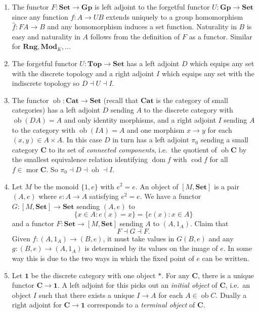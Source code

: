 \documentclass[a4paper]{article}
\renewcommand{\c}[1]{\mathbf{#1}}
\DeclareMathOperator{\ob}{ob}
\DeclareMathOperator{\mor}{mor}
\DeclareMathOperator{\dom}{dom}
\DeclareMathOperator{\cod}{cod}
\newcommand{\Set}{{\c{Set}}}
\newcommand{\Top}{{\c{Top}}}
\newcommand{\adjoint}{\dashv}
\begin{document}
\begin{eg}\leavevmode
  \begin{enumerate}
  \item The functor \(F: \Set \to \c{Gp}\) is left adjoint to the forgetful functor \(U: \c{Gp} \to \Set\) since any function \(f: A \to UB\) extends uniquely to a group homomorphism \(\hat f: FA \to B\) and any homomorphism induces a set function. Naturality in \(B\) is easy and naturality in \(A\) follows from the definition of \(F\) as a functor. Similar for \(\c{Rng}, \c{Mod}_K, \dots\)
  \item The forgetful functor \(U: \Top \to \Set\) has a left adjoint \(D\) which equips any set with the discrete topology and a right adjoint \(I\) which equips any set with the indiscrete topology so \(D \adjoint U \adjoint I\).
  \item The functor \(\ob: \c{Cat} \to \Set\) (recall that \(\c{Cat}\) is the category of small categories) has a left adjoint \(D\) sending \(A\) to the discrete category with \(\ob(DA) = A\) and only identity morphisms, and a right adjoint \(I\) sending \(A\) to the category with \(\ob(IA) = A\) and one morphism \(x \to y\) for each \((x, y) \in A \times A\). In this case \(D\) in turn has a left adjoint \(\pi_0\) sending a small category \(\c C\) to its set of \emph{connected components}, i.e.\ the quotient of \(\ob \c C\) by the smallest equivalence relation identifying \(\dom f\) with \(\cod f\) for all \(f \in \mor \c C\). So \(\pi_0 \adjoint D \adjoint \ob \adjoint I\).
  \item Let \(M\) be the monoid \(\{1, e\}\) with \(e^2 = e\). An object of \([M, \Set]\) is a pair \((A, e)\) where \(e: A \to A\) satisfying \(e^2 = e\). We have a functor \(G: [M, \Set] \to \Set\) sending \((A, e)\) to
    \[
      \{x \in A: e(x) = x\} = \{e(x): x \in A\}
    \]
    and a functor \(F: \Set \to [M, \Set]\) sending \(A\) to \((A, 1_A)\). Claim that
    \[
      F \adjoint G \adjoint F.
    \]
    Given \(f: (A, 1_A) \to (B, e)\), it must take values in \(G(B, e)\) and any \(g: (B, e) \to (A, 1_A)\) is determined by its values on the image of \(e\). In some way this is due to the two ways in which the fixed point of \(e\) can be written.
  \item Let \(\c 1\) be the discrete category with one object \(*\). For any \(\c C\), there is a unique functor \(\c C \to \c 1\). A left adjoint for this picks out an \emph{initial object} of \(\c C\), i.e.\ an object \(I\) such that there exists a unique \(I \to A\) for each \(A \in \ob C\). Dually a right adjoint for \(\c C \to \c 1\) corresponds to a \emph{terminal object} of \(\c C\).

\end{enumerate}
\end{eg}
\end{document}
